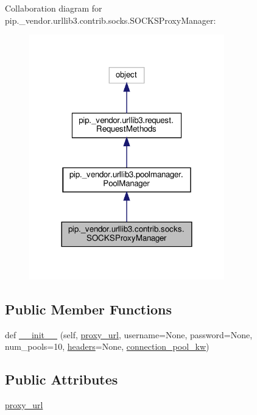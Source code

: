 Collaboration diagram for pip.\+\_\+vendor.\+urllib3.\+contrib.\+socks.\+S\+O\+C\+K\+S\+Proxy\+Manager\+:
\nopagebreak
\begin{figure}[H]
\begin{center}
\leavevmode
\includegraphics[width=240pt]{classpip_1_1__vendor_1_1urllib3_1_1contrib_1_1socks_1_1SOCKSProxyManager__coll__graph}
\end{center}
\end{figure}
\subsection*{Public Member Functions}
\begin{DoxyCompactItemize}
\item 
def \hyperlink{classpip_1_1__vendor_1_1urllib3_1_1contrib_1_1socks_1_1SOCKSProxyManager_a3309ed03008c9da82a61a7c7b747f2c2}{\+\_\+\+\_\+init\+\_\+\+\_\+} (self, \hyperlink{classpip_1_1__vendor_1_1urllib3_1_1contrib_1_1socks_1_1SOCKSProxyManager_ac32f8a964db9f9a8b92a0bda03a90ddb}{proxy\+\_\+url}, username=None, password=None, num\+\_\+pools=10, \hyperlink{classpip_1_1__vendor_1_1urllib3_1_1request_1_1RequestMethods_a507ade459b427bd81a5a8849563702e3}{headers}=None, \hyperlink{classpip_1_1__vendor_1_1urllib3_1_1poolmanager_1_1PoolManager_a509374901e1f086853c6df9928b7312a}{connection\+\_\+pool\+\_\+kw})
\end{DoxyCompactItemize}
\subsection*{Public Attributes}
\begin{DoxyCompactItemize}
\item 
\hyperlink{classpip_1_1__vendor_1_1urllib3_1_1contrib_1_1socks_1_1SOCKSProxyManager_ac32f8a964db9f9a8b92a0bda03a90ddb}{proxy\+\_\+url}
\end{DoxyCompactItemize}
